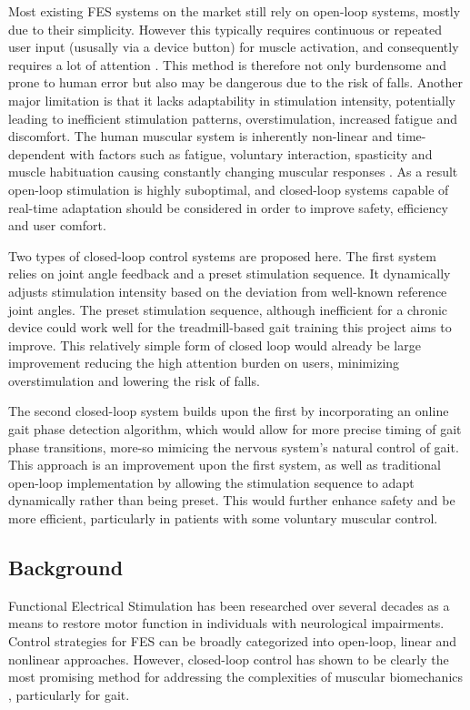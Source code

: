 Most existing FES systems on the market still rely on open-loop systems, mostly due to their simplicity\cite{braz_functional_2009}. However this typically requires continuous or repeated user input (ususally via a device button) for muscle activation, and consequently requires a lot of attention \cite{hayami_development_2022}. This method is therefore not only burdensome and prone to human error but also may be dangerous due to the risk of falls. Another major limitation is that it lacks adaptability in stimulation intensity, potentially leading to inefficient stimulation patterns, overstimulation, increased fatigue and discomfort. The human muscular system is inherently non-linear and time-dependent with factors such as fatigue, voluntary interaction, spasticity and muscle habituation causing constantly changing muscular responses . As a result open-loop stimulation is highly suboptimal, and closed-loop systems capable of real-time adaptation should be considered in order to improve safety, efficiency and user comfort.

Two types of closed-loop control systems are proposed here. The first system relies on joint angle feedback and a preset stimulation sequence. It dynamically adjusts stimulation intensity based on the deviation from well-known reference joint angles. The preset stimulation sequence, although inefficient for a chronic device could work well for the treadmill-based gait training this project aims to improve. This relatively simple form of closed loop would already be large improvement reducing the high attention burden on users, minimizing overstimulation and lowering the risk of falls.  

The second closed-loop system builds upon the first by incorporating an online gait phase detection algorithm, which would allow for more precise timing of gait phase transitions, more-so mimicing the nervous system's natural control of gait. This approach is an improvement upon the first system, as well as traditional open-loop implementation by allowing the stimulation sequence to adapt dynamically rather than being preset. This would further enhance safety and be more efficient, particularly in patients with some voluntary muscular control.

\subsection{Background}
Functional Electrical Stimulation has been researched over several decades as a means to restore motor function in individuals with neurological impairments. Control strategies for FES can be broadly categorized into open-loop, linear and nonlinear approaches. However, closed-loop control has shown to be clearly the most promising method for addressing the complexities of muscular biomechanics \cite{chaikho_transcutaneous_2022}, particularly for gait.

